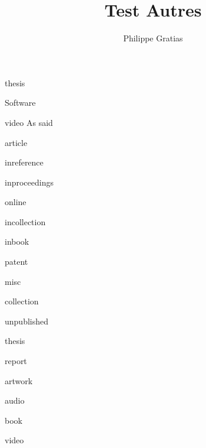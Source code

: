 \documentclass[11pt, oneside]{article}   	%
\title{Test Autres}
\author{Philippe Gratias}
\begin{document}
\maketitle

thesis \cite{tuloup_gestion_2021}

\cite{gross_communicating_2002}

Software \cite{noauthor_hpc-mathssamurai_cras_2021_2021, grootveld_fair_2018}

video As \textcite{grootveld_fair_2018} said

\cite{noauthor_peculiar_1665}

\cite{acharya_2019_2019}

article \cite{cunningham_extraordinary_1957}

inreference \cite{noauthor_initiative_2018}

inproceedings \cite{aksnes_criteria-based_2018}

online \cite{bruck_recognition_2016}

incollection \cite{recknagel_preserve_2018}

inbook \cite{sternberg_writing_2000}

patent \cite{goldman_position_2023}

misc \cite{elser_empairex_2019}

collection \cite{bartling_opening_2014}

unpublished \cite{von_arlitsch_driving_2017}

thesis \cite{bizos_big_2020} \cite{blanchard_retrospective_2022}

report \cite{noauthor_aligning_2022}

artwork \cite{richard_photographs_2016}

audio \cite{ghys_whats_nodate}

book \cite{balibar_life_2017}

video \cite{bechgaard_electrocrystallisation_2023}

\cite{brahe_astronomiae_1602}

\printbibliography
\end{document}
